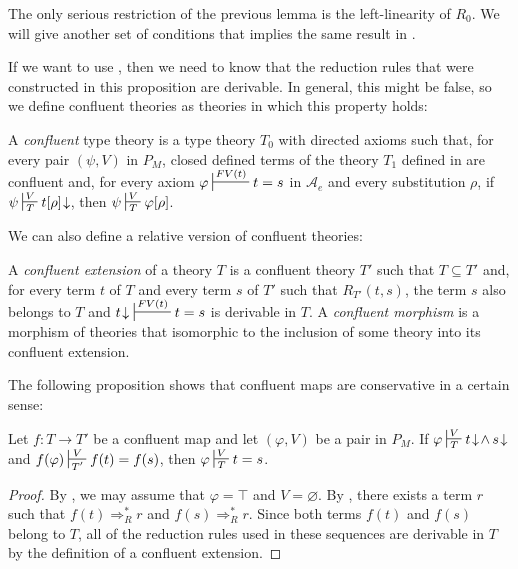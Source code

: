 \documentclass[reqno]{amsart}
\theoremstyle{definition}
\theoremstyle{remark}
\numberwithin{figure}{section}
\begin{document}
The only serious restriction of the previous lemma is the left-linearity of $R_0$.
We will give another set of conditions that implies the same result in .

If we want to use , then we need to know that the reduction rules that were constructed in this proposition are derivable.
In general, this might be false, so we define confluent theories as theories in which this property holds:

\begin{defn}[confluent]
A \emph{confluent} type theory is a type theory $T_0$ with directed axioms such that, for every pair $(\psi,V)$ in $P_M$,
closed defined terms of the theory $T_1$ defined in  are confluent and,
for every axiom $\varphi \sststile{}{FV(t)} t = s$ in $\mathcal{A}_e$ and every substitution $\rho$,
if $\psi \sststile{T}{V} t[\rho]\!\downarrow$, then $\psi \sststile{T}{V} \varphi[\rho]$.
\end{defn}

We can also define a relative version of confluent theories:

\begin{defn}
A \emph{confluent extension} of a theory $T$ is a confluent theory $T'$ such that $T \subseteq T'$ and, for every term $t$ of $T$ and every term $s$ of $T'$ such that $R_{T'}(t,s)$,
the term $s$ also belongs to $T$ and $t\!\downarrow\ \sststile{}{FV(t)} t = s$ is derivable in $T$.
A \emph{confluent morphism} is a morphism of theories that isomorphic to the inclusion of some theory into its confluent extension.
\end{defn}

The following proposition shows that confluent maps are conservative in a certain sense:

\begin{prop}
Let $f : T \to T'$ be a confluent map and let $(\varphi,V)$ be a pair in $P_M$.
If $\varphi \sststile{T}{V} t\!\downarrow\!\land\,s\!\downarrow$ and $f(\varphi) \sststile{T'}{V} f(t) = f(s)$, then $\varphi \sststile{T}{V} t = s$.
\end{prop}
\begin{proof}
By , we may assume that $\varphi = \top$ and $V = \varnothing$.
By , there exists a term $r$ such that $f(t) \Rightarrow_R^* r$ and $f(s) \Rightarrow_R^* r$.
Since both terms $f(t)$ and $f(s)$ belong to $T$, all of the reduction rules used in these sequences are derivable in $T$ by the definition of a confluent extension.
\end{proof}
\end{document}
